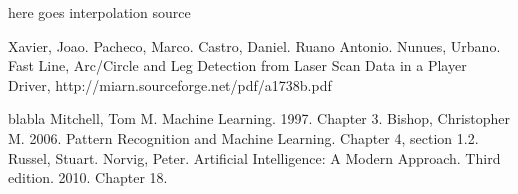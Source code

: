 \documentclass[a4paper, 10pt, conference]{ieeeconf}      %
\begin{document}













\begin{thebibliography}{}
 here goes interpolation source

Xavier, Joao. Pacheco, Marco. Castro, Daniel. Ruano Antonio. Nunues, Urbano. Fast Line, Arc/Circle and Leg Detection from Laser Scan Data in a Player Driver, http://miarn.sourceforge.net/pdf/a1738b.pdf

blabla
 Mitchell, Tom M. Machine Learning. 1997. Chapter 3.
 Bishop, Christopher M. 2006. Pattern Recognition and Machine Learning. Chapter 4, section 1.2.
 Russel, Stuart. Norvig, Peter. Artificial Intelligence: A Modern Approach. Third edition. 2010. Chapter 18. 
\end{thebibliography}
\end{document}
